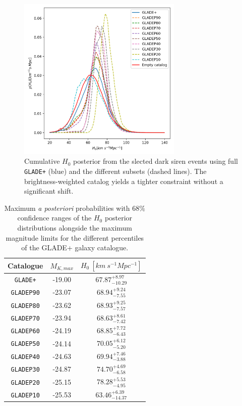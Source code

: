 \begin{figure}[ht]
    \centering
    \includegraphics[width=0.7\textwidth]{figures/percentile_full_dict.png}
    \caption[Cumulative $H_0$ posterior from the slected dark siren events using full \texttt{GLADE+} and the different subsets.]{Cumulative $H_0$ posterior from the slected dark siren events using full \texttt{GLADE+} (blue) and the different subsets (dashed lines). The brightness-weighted catalog yields a tighter constraint without a significant shift.}
    \label{fig:h0_cumulative}
\end{figure}

\begin{table}
    \centering
    \caption[$H_0$ MAP values with $68\%$ confidence ranges, alongside the maximum magnitude limits for \texttt{GLADE+} and the different subsets.]{Maximum {\em a posteriori} probabilities with $68\%$ confidence ranges of the $H_0$ posterior distributions alongside the maximum magnitude limits for the different percentiles of the GLADE+ galaxy catalogue.}
    \begin{tabular}{c c c }
    \hline
        \textbf{Catalogue} & $M_{K, max}$ & $H_0~[km~s^{-1}Mpc^{-1}]$ \\ \hline
        \texttt{GLADE+} & -19.00 & $67.87^{+8.97}_{-10.29}$ \\
        \texttt{GLADEP90} & -23.07 & $68.94^{+9.24}_{-7.55}$ \\
        \texttt{GLADEP80} & -23.62 & $68.93^{+9.25}_{-7.57}$ \\
        \texttt{GLADEP70} & -23.94 & $68.63^{+8.61}_{-7.42}$ \\
        \texttt{GLADEP60} & -24.19 & $68.85^{+7.72}_{-6.43}$ \\
        \texttt{GLADEP50} & -24.14  & $70.05^{+6.12}_{-5.20}$ \\
        \texttt{GLADEP40} & -24.63 & $69.94^{+7.46}_{-3.88}$ \\
        \texttt{GLADEP30} & -24.87 & $74.70^{+4.69}_{-6.58}$ \\
        \texttt{GLADEP20} & -25.15 & $78.28^{+5.53}_{-4.95}$ \\
        \texttt{GLADEP10} & -25.53 & $63.46^{+6.39}_{-14.37}$ \\ \hline
    \end{tabular}
    \label{tab:h0_stats}
\end{table}

